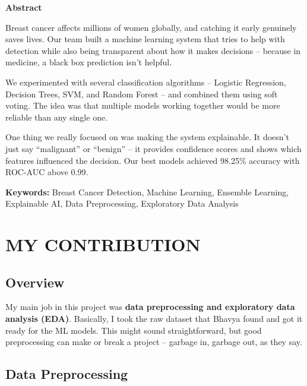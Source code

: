 \documentclass[12pt]{article}
\begin{document}
\newpage
{}
\begin{center}
    \textbf{\Large Abstract}
\end{center}

\noindent Breast cancer affects millions of women globally, and catching it early genuinely saves lives. Our team built a machine learning system that tries to help with detection while also being transparent about how it makes decisions -- because in medicine, a black box prediction isn't helpful.

\vspace{0.5cm}
\noindent We experimented with several classification algorithms -- Logistic Regression, Decision Trees, SVM, and Random Forest -- and combined them using soft voting. The idea was that multiple models working together would be more reliable than any single one.

\vspace{0.5cm}
\noindent One thing we really focused on was making the system explainable. It doesn't just say ``malignant'' or ``benign'' -- it provides confidence scores and shows which features influenced the decision. Our best models achieved 98.25\% accuracy with ROC-AUC above 0.99.

\vspace{0.5cm}
\noindent \textbf{Keywords:} Breast Cancer Detection, Machine Learning, Ensemble Learning, Explainable AI, Data Preprocessing, Exploratory Data Analysis

\newpage
\tableofcontents

\newpage
{}
\section{MY CONTRIBUTION}

\subsection{Overview}
My main job in this project was \textbf{data preprocessing and exploratory data analysis (EDA)}. Basically, I took the raw dataset that Bhavya found and got it ready for the ML models. This might sound straightforward, but good preprocessing can make or break a project -- garbage in, garbage out, as they say.

\subsection{Data Preprocessing}
\end{document}
